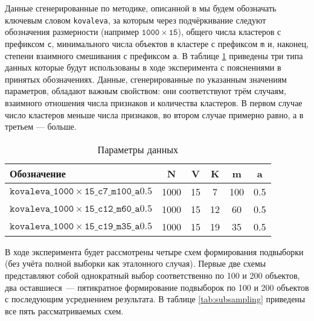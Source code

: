 \documentclass[12pt]{a&t}
\begin{document}
Данные сгенерированные по методике, описанной в \cite{Kovaleva} мы будем обозначать ключевым словом \texttt{kovaleva}, за которым через подчёркивание следуют обозначения размерности (например \mbox{$\mathtt{1000 \times 15 } $}), общего числа кластеров с префиксом \texttt{с}, минимального числа объектов в кластере с префиксом \texttt{m} и, наконец, степени взаимного смешивания с префиксом \texttt{a}. В таблице \ref{tab:datasets} приведены три типа данных которые будут использованы в ходе эксперимента с пояснениями в принятых обозначениях. Данные, сгенерированные по указанным значениям параметров, обладают важным свойством: они соответствуют трём случаям, взаимного отношения числа признаков и количества кластеров. В первом случае число кластеров меньше числа признаков, во втором случае примерно равно, а в третьем --- больше.

\begin{table}[h!]
	\centering
	\caption{Параметры данных} \label{tab:datasets}
	\begin{tabular}{ |l|c|c|c|c|c| }
					\hline Обозначение               & N & V & K & m & a\\ 
					\hline $\mathtt{kovaleva\_1000 \times 15\_c7\_m100\_a0.5}$ & 1000 & 15 & 7 & 100 & 0.5\\ 
					\hline $\mathtt{kovaleva\_1000 \times 15\_c12\_m60\_a0.5}$ & 1000 & 15 & 12 & 60 & 0.5\\ 
					\hline $\mathtt{kovaleva\_1000 \times 15\_c19\_m35\_a0.5}$ & 1000 & 15 & 19 & 35 & 0.5\\ 
					\hline
	\end{tabular}
\end{table}

В ходе эксперимента будет рассмотрены четыре схем формирования подвыборки (без учёта полной выборки как эталонного случая). Первые две схемы представляют собой однократный выбор соответственно по 100 и 200 объектов, два оставшиеся~--- пятикратное формирование подвыборок по 100 и 200 объектов с последующим усреднением результата. В таблице \ref{tab:subsampling} приведены все пять рассматриваемых схем. 
\end{document}

